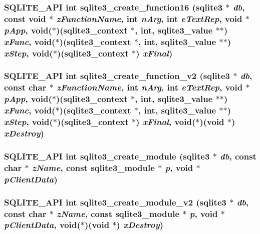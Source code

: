 \subsubsection{\setlength{\rightskip}{0pt plus 5cm}SQLITE\_\-API int sqlite3\_\-create\_\-function16 (\bf{sqlite3} $\ast$ {\em db}, const void $\ast$ {\em z\-Function\-Name}, int {\em n\-Arg}, int {\em e\-Text\-Rep}, void $\ast$ {\em p\-App}, void($\ast$)(\bf{sqlite3\_\-context} $\ast$, int, \bf{sqlite3\_\-value} $\ast$$\ast$) {\em x\-Func}, void($\ast$)(\bf{sqlite3\_\-context} $\ast$, int, \bf{sqlite3\_\-value} $\ast$$\ast$) {\em x\-Step}, void($\ast$)(\bf{sqlite3\_\-context} $\ast$) {\em x\-Final})}\label{sqlite3_8h_5d852d74f7a67d560e44564aaf75c6b3}


\subsubsection{\setlength{\rightskip}{0pt plus 5cm}SQLITE\_\-API int sqlite3\_\-create\_\-function\_\-v2 (\bf{sqlite3} $\ast$ {\em db}, const char $\ast$ {\em z\-Function\-Name}, int {\em n\-Arg}, int {\em e\-Text\-Rep}, void $\ast$ {\em p\-App}, void($\ast$)(\bf{sqlite3\_\-context} $\ast$, int, \bf{sqlite3\_\-value} $\ast$$\ast$) {\em x\-Func}, void($\ast$)(\bf{sqlite3\_\-context} $\ast$, int, \bf{sqlite3\_\-value} $\ast$$\ast$) {\em x\-Step}, void($\ast$)(\bf{sqlite3\_\-context} $\ast$) {\em x\-Final}, void($\ast$)(void $\ast$) {\em x\-Destroy})}\label{sqlite3_8h_14dd082584947d02a37f0509d7049aa3}


\subsubsection{\setlength{\rightskip}{0pt plus 5cm}SQLITE\_\-API int sqlite3\_\-create\_\-module (\bf{sqlite3} $\ast$ {\em db}, const char $\ast$ {\em z\-Name}, const \bf{sqlite3\_\-module} $\ast$ {\em p}, void $\ast$ {\em p\-Client\-Data})}\label{sqlite3_8h_e8a0bf6f9a28a7568bf9751ab4e17d79}


\subsubsection{\setlength{\rightskip}{0pt plus 5cm}SQLITE\_\-API int sqlite3\_\-create\_\-module\_\-v2 (\bf{sqlite3} $\ast$ {\em db}, const char $\ast$ {\em z\-Name}, const \bf{sqlite3\_\-module} $\ast$ {\em p}, void $\ast$ {\em p\-Client\-Data}, void($\ast$)(void $\ast$) {\em x\-Destroy})}\label{sqlite3_8h_ad75a3ba8b1c309327f67292e0360380}


